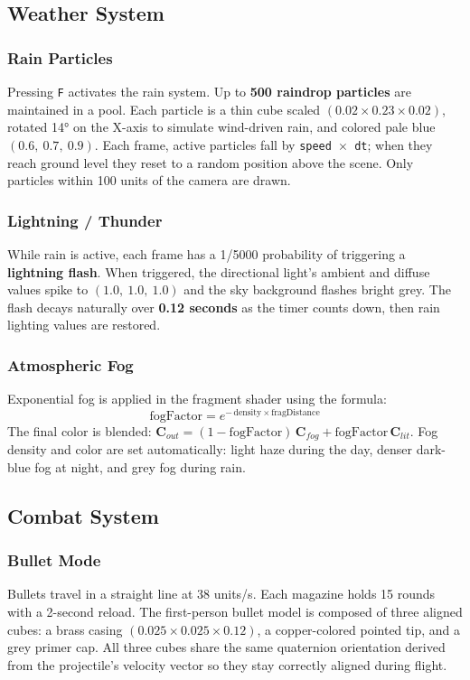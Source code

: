 \documentclass[12pt,a4paper]{article}
\begin{document}
\subsection{Weather System}

\subsubsection*{Rain Particles}
Pressing \texttt{F} activates the rain system. Up to \textbf{500 raindrop particles} are maintained in a pool. Each particle is a thin cube scaled $(0.02 \times 0.23 \times 0.02)$, rotated 14° on the X-axis to simulate wind-driven rain, and colored pale blue $(0.6,\ 0.7,\ 0.9)$. Each frame, active particles fall by \texttt{speed $\times$ dt}; when they reach ground level they reset to a random position above the scene. Only particles within 100 units of the camera are drawn.

\subsubsection*{Lightning / Thunder}
While rain is active, each frame has a 1/5000 probability of triggering a \textbf{lightning flash}. When triggered, the directional light's ambient and diffuse values spike to $(1.0,\ 1.0,\ 1.0)$ and the sky background flashes bright grey. The flash decays naturally over \textbf{0.12 seconds} as the timer counts down, then rain lighting values are restored.

\subsubsection*{Atmospheric Fog}
Exponential fog is applied in the fragment shader using the formula:
\begin{equation}
    \text{fogFactor} = e^{-\,\text{density} \times \text{fragDistance}}
\end{equation}
The final color is blended: $\mathbf{C}_{out} = (1 - \text{fogFactor})\,\mathbf{C}_{fog} + \text{fogFactor}\,\mathbf{C}_{lit}$. Fog density and color are set automatically: light haze during the day, denser dark-blue fog at night, and grey fog during rain.

\subsection{Combat System}

\subsubsection*{Bullet Mode}
Bullets travel in a straight line at 38 units/s. Each magazine holds 15 rounds with a 2-second reload. The first-person bullet model is composed of three aligned cubes: a brass casing $(0.025 \times 0.025 \times 0.12)$, a copper-colored pointed tip, and a grey primer cap. All three cubes share the same quaternion orientation derived from the projectile's velocity vector so they stay correctly aligned during flight.
\end{document}
